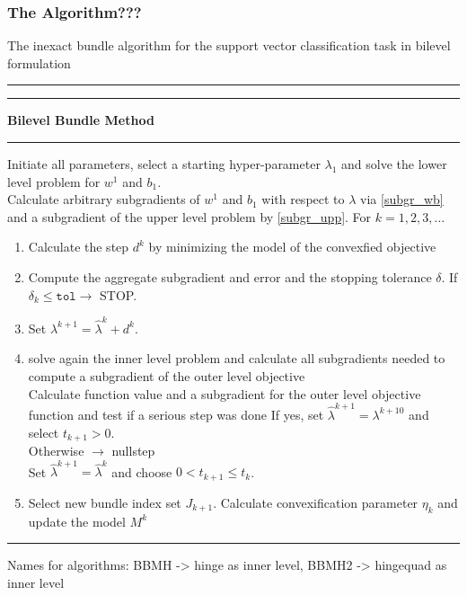 \subsubsection{The Algorithm???}

The inexact bundle algorithm for the support vector classification task in bilevel formulation 
\vspace{1.5em}
\hrule  \vspace{0.4ex} \hrule
\vspace{1ex}
\textbf{Bilevel Bundle Method}
\vspace{1ex}
\hrule
\vspace{1ex}
Initiate all parameters, select a starting hyper-parameter \(\lambda_1\) and solve the lower level problem for \(w^1\) and \(b_1\). \\
Calculate arbitrary subgradients of \(w^1\) and \(b_1\) with respect to \(\lambda\) via \ref{subgr_wb} and a subgradient of the upper level problem by \ref{subgr_upp}.  
For \(k = 1,2,3,  \dotsc \)   

\begin{enumerate}
	\item Calculate the step \(d^k\) by minimizing the model of the convexfied objective
	\item Compute the aggregate subgradient and error and the stopping tolerance \(\delta\).
		If \(\delta_k \leq \mathtt{tol} \rightarrow \) STOP.
	\item Set \( \lambda^{k+1} = \hat{\lambda}^k + d^k \).
	\item solve again the inner level problem and calculate all subgradients needed to compute a subgradient of the outer level objective \\
	Calculate function value and a subgradient for the outer level objective function and test if a serious step was done 
	If yes, set \(\hat{\lambda}^{k+1} = \lambda^{k+10}\) and select \(t_{k+1} > 0\). \\
	Otherwise \(\rightarrow\) nullstep \\
	Set \(\hat{\lambda}^{k+1} = \hat{\lambda}^k\) and choose \(0 < t_{k+1} \leq t_k\). 	
	\item Select new bundle index set \(J_{k+1}\). Calculate convexification parameter \(\eta_k\)
	and update the model \(M^k\)
\end{enumerate}
\vspace{1ex}
\hrule
\vspace{1.5em}

Names for algorithms: BBMH -> hinge as inner level, BBMH2 -> hingequad as inner level 

